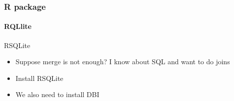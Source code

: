 \documentclass[10pt,handout,english]{beamer}\usepackage[]{graphicx}\usepackage[]{color}
\makeatletter
\newenvironment{kframe}{%
 \def\at@end@of@kframe{}%
 \ifinner\ifhmode%
  \def\at@end@of@kframe{\end{minipage}}%
  \begin{minipage}{\columnwidth}%
 \fi\fi%
 \def\FrameCommand##1{\hskip\@totalleftmargin \hskip-\fboxsep
 \colorbox{shadecolor}{##1}\hskip-\fboxsep
     \hskip-\linewidth \hskip-\@totalleftmargin \hskip\columnwidth}%
 \MakeFramed {\advance\hsize-\width
   \@totalleftmargin\z@ \linewidth\hsize
   \@setminipage}}%
 {\par\unskip\endMakeFramed%
 \at@end@of@kframe}
\newenvironment{knitrout}{}{} %
\makeatother
\begin{document}
\begin{frame}[fragile]
  \frametitle{R package}
  \framesubtitle{RQLlite}
  \begin{block}{RSQLite}
  \begin{itemize}
  \item Suppose merge is not enough? I know about SQL and want to do joins
  \item Install RSQLite
  \item We also need to install DBI
  \end{itemize}
  \end{block}
\begin{knitrout}
\color{fgcolor}\begin{kframe}


{\ttfamily\noindent\itshape\color{messagecolor}{\#\# Loading required package: RSQLite}}\end{kframe}
\end{knitrout}


\end{frame}
\end{document}
